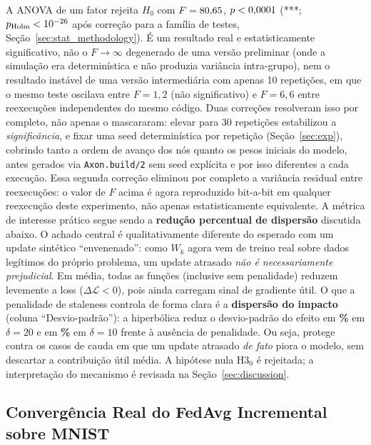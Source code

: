 \documentclass[conference,a4paper]{IEEEtran}
\begin{document}
A ANOVA de um fator rejeita $H_0$ com $F=80{,}65$, $p<0{,}0001$
(***; $p_{\text{Holm}}<10^{-26}$ após correção para a família de
\statHolmFamilySize{} testes, Seção~\ref{sec:stat_methodology}). É um resultado real e estatisticamente significativo, não o
$F\to\infty$ degenerado de uma versão preliminar (onde a simulação era
determinística e não produzia variância intra-grupo), nem o resultado
instável de uma versão intermediária com apenas 10 repetições, em que o
mesmo teste oscilava entre $F=1{,}2$ (não significativo) e $F=6{,}6$ entre
reexecuções independentes do mesmo código. Duas correções resolveram isso
por completo, não apenas o mascararam: elevar para 30 repetições estabilizou
a \emph{significância}, e fixar uma seed determinística por repetição
(Seção~\ref{sec:exp}), cobrindo tanto a ordem de avanço dos nós quanto os
pesos iniciais do modelo, antes gerados via \texttt{Axon.build/2} sem seed
explícita e por isso diferentes a cada execução. Essa segunda correção eliminou por completo a
variância residual entre reexecuções: o valor de $F$ acima é agora
reproduzido bit-a-bit em qualquer reexecução deste experimento, não apenas
estatisticamente equivalente. A métrica de interesse prático segue sendo a
\textbf{redução percentual de dispersão} discutida abaixo. O
achado central é qualitativamente diferente do esperado com um update
sintético ``envenenado'': como $W_k$ agora vem de treino real sobre dados
legítimos do próprio problema, um update atrasado \emph{não é
necessariamente prejudicial}. Em média, todas as funções (inclusive
sem penalidade) reduzem levemente a loss ($\Delta\mathcal{L}<0$), pois
ainda carregam sinal de gradiente útil. O que a penalidade de staleness
controla de forma clara é a \textbf{dispersão do impacto} (coluna
``Desvio-padrão''): a hiperbólica reduz o desvio-padrão do efeito em
\textbf{\statExpBHypReductionGapTwenty\%} em $\delta=20$ e em \textbf{\statExpBHypReductionGapTen\%} em $\delta=10$ frente
à ausência de penalidade. Ou seja, protege contra os
casos de cauda em que um update atrasado \emph{de fato} piora o modelo, sem
descartar a contribuição útil média. A hipótese nula H3$_0$ é rejeitada;
a interpretação do mecanismo é revisada na Seção~\ref{sec:discussion}.

\subsection{Convergência Real do FedAvg Incremental sobre MNIST}
\end{document}
